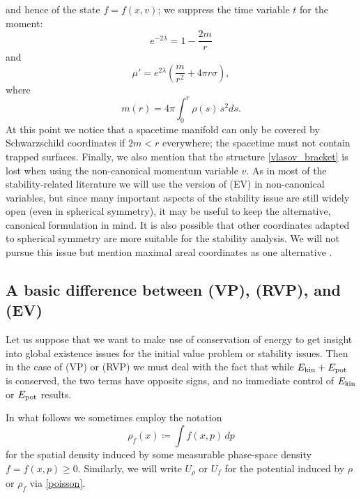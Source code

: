 \documentclass[11pt]{article}
\begin{document}
and hence of the state $f=f(x,v)$; we suppress the time variable $t$
for the moment:
\begin{equation} \label{lambdam}
  e^{-2\lambda} = 1-\frac{2 m}{r}
\end{equation}
and
\begin{equation} \label{muprm}
  \mu' = e^{2\lambda}\left(\frac{m}{r^2} + 4\pi r \sigma\right), 
\end{equation}
where 
\begin{equation} \label{mdef}
  m(r) = 4\pi \int_0^r \rho(s)\, s^2 ds.
\end{equation}
At this point we notice that a spacetime manifold can only be covered by
Schwarzschild coordinates if $2 m < r$ everywhere; the spacetime must not
contain trapped surfaces. Finally, we also mention that the structure
\eqref{vlasov_bracket} is lost when using the non-canonical momentum
variable $v$. As in most of the stability-related literature
we will use the version of (EV) in non-canonical variables,
but since many important aspects of the stability issue are still widely
open (even in spherical symmetry), it may be useful to keep the
alternative, canonical formulation in mind. It is also possible that
other coordinates adapted to spherical symmetry are more suitable
for the stability analysis. We will not pursue this issue but mention
maximal areal coordinates as one alternative \cite{GueRe21}.
%
%
\subsection{A basic difference between (VP), (RVP), and (EV)}
\label{ss_criticality}
%
%
Let us suppose that we want to make use of conservation of energy to get insight
into global existence issues for the initial value problem or stability issues.
Then in the case of (VP) or (RVP) we must deal with the fact that
while $E_\mathrm{kin} + E_\mathrm{pot}$ is conserved, the two terms have opposite signs, and
no immediate control of  $E_\mathrm{kin}$ or  $E_\mathrm{pot}$ results.

In what follows we sometimes employ the notation
\[
\rho_f(x)\coloneqq\int f(x,p)\, dp
\]
for the spatial density induced by some measurable phase-space
density $f=f(x,p)\geq 0$. Similarly, we will write $U_\rho$ or
$U_f$ for the potential induced by $\rho$ or $\rho_f$ via \eqref{poisson}.
\end{document}
